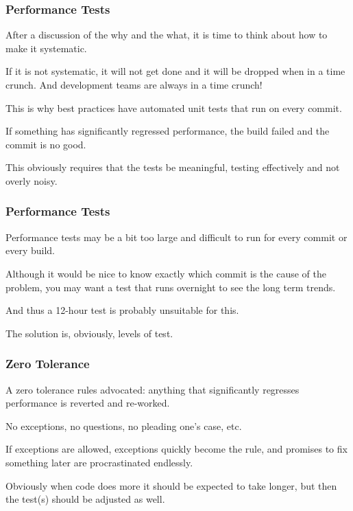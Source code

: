 \begin{frame}
\frametitle{Performance Tests}

After a discussion of the why and the what, it is time to think about how to make it systematic. 

If it is not systematic, it will not get done and it will be dropped when in a time crunch. And development teams are always in a time crunch! 

This is why best practices have automated unit tests that run on every commit. 

If something has significantly regressed performance, the build failed and the commit is no good. 

This obviously requires that the tests be meaningful, testing effectively and not overly noisy. 

\end{frame}



\begin{frame}
\frametitle{Performance Tests}

Performance tests may be a bit too large and difficult to run for every commit or every build. 

Although it would be nice to know exactly which commit is the cause of the problem, you may want a test that runs overnight to see the long term trends. 

And thus a 12-hour test is probably unsuitable for this. 

The solution is, obviously, levels of test. 

\end{frame}



\begin{frame}
\frametitle{Zero Tolerance}

A zero tolerance rules advocated: anything that significantly regresses performance is reverted and re-worked. 

No exceptions, no questions, no pleading one's case, etc. 

If exceptions are allowed, exceptions quickly become the rule, and promises to fix something later are procrastinated endlessly.

Obviously when code does more it should be expected to take longer, but then the test(s) should be adjusted as well.

\end{frame}



